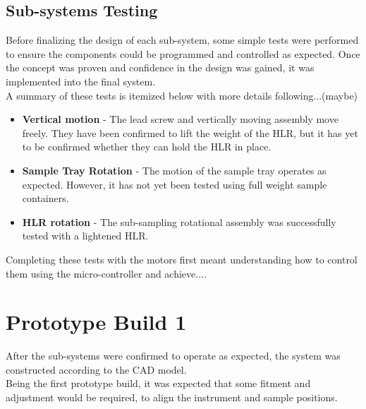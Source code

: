 \documentclass{UoNMCHA}
\numberwithin{equation}{section}
\begin{document}
\subsection{Sub-systems Testing}
Before finalizing the design of each sub-system, some simple tests were performed to ensure the components could be programmed and controlled as expected. Once the concept was proven and confidence in the design was gained, it was implemented into the final system.\\
A summary of these tests is itemized below with more details following...(maybe) \\
\begin{itemize}
	\item \textbf{Vertical motion} - The lead screw and vertically moving assembly move freely. They have been confirmed to lift the weight of the HLR, but it has yet to be confirmed whether they can hold the HLR in place.
	\item \textbf{Sample Tray Rotation} - The motion of the sample tray operates as expected. However, it has not yet been tested using full weight sample containers.
	\item \textbf{HLR rotation} - The sub-sampling rotational assembly was successfully tested with a lightened HLR.
\end{itemize}
Completing these tests with the motors first meant understanding how to control them using the micro-controller and achieve.... \\

\newpage
\section{Prototype Build 1}\label{sec:Prototype Build 1}
After the sub-systems were confirmed to operate as expected, the system was constructed according to the CAD model.\\
Being the first prototype build, it was expected that some fitment and adjustment would be required, to align the instrument and sample positions.\\
\end{document}
